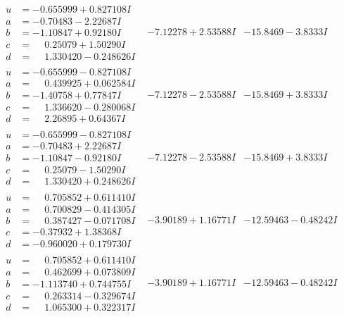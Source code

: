 \documentclass[1p]{elsarticle_modified}
\theoremstyle{definition}
\begin{document}
$$\begin{array}{c|c|c}
\begin{aligned}
u &= -0.655999 + 0.827108 I \\
a &= -0.70483 - 2.22687 I \\
b &= -1.10847 + 0.92180 I \\
c &= \phantom{-}0.25079 + 1.50290 I \\
d &= \phantom{-}1.330420 - 0.248626 I\end{aligned}
 & -7.12278 + 2.53588 I & -15.8469 - 3.8333 I \\ \hline\begin{aligned}
u &= -0.655999 - 0.827108 I \\
a &= \phantom{-}0.439925 + 0.062584 I \\
b &= -1.40758 + 0.77847 I \\
c &= \phantom{-}1.336620 - 0.280068 I \\
d &= \phantom{-}2.26895 + 0.64367 I\end{aligned}
 & -7.12278 - 2.53588 I & -15.8469 + 3.8333 I \\ \hline\begin{aligned}
u &= -0.655999 - 0.827108 I \\
a &= -0.70483 + 2.22687 I \\
b &= -1.10847 - 0.92180 I \\
c &= \phantom{-}0.25079 - 1.50290 I \\
d &= \phantom{-}1.330420 + 0.248626 I\end{aligned}
 & -7.12278 - 2.53588 I & -15.8469 + 3.8333 I \\ \hline\begin{aligned}
u &= \phantom{-}0.705852 + 0.611410 I \\
a &= \phantom{-}0.700829 - 0.414305 I \\
b &= \phantom{-}0.387427 - 0.071708 I \\
c &= -0.37932 + 1.38368 I \\
d &= -0.960020 + 0.179730 I\end{aligned}
 & -3.90189 + 1.16771 I & -12.59463 - 0.48242 I \\ \hline\begin{aligned}
u &= \phantom{-}0.705852 + 0.611410 I \\
a &= \phantom{-}0.462699 + 0.073809 I \\
b &= -1.113740 + 0.744755 I \\
c &= \phantom{-}0.263314 - 0.329674 I \\
d &= \phantom{-}1.065300 + 0.322317 I\end{aligned}
 & -3.90189 + 1.16771 I & -12.59463 - 0.48242 I\\

\end{array}$$
\end{document}
